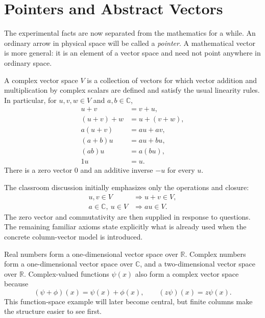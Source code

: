 \begin{classroomqa}
\end{classroomqa}

\section{Pointers and Abstract Vectors}

The experimental facts are now separated from the mathematics for a while. An ordinary arrow in physical space will be called a \emph{pointer}. A mathematical vector is more general: it is an element of a vector space and need not point anywhere in ordinary space.

\begin{definition}
A complex vector space \(V\) is a collection of vectors for which vector addition and multiplication by complex scalars are defined and satisfy the usual linearity rules. In particular, for \(u,v,w\in V\) and \(a,b\in\mathbb C\),
\begin{align}
  u+v&=v+u,\\
  (u+v)+w&=u+(v+w),\\
  a(u+v)&=au+av,\\
  (a+b)u&=au+bu,\\
  (ab)u&=a(bu),\\
  1u&=u.
\end{align}
There is a zero vector \(0\) and an additive inverse \(-u\) for every \(u\).
\end{definition}

The classroom discussion initially emphasizes only the operations and closure:
\begin{equation}
\begin{aligned}
  u,v\in V&\Longrightarrow u+v\in V,\\
  a\in\mathbb C,\ u\in V&\Longrightarrow au\in V.
\end{aligned}
\end{equation}
The zero vector and commutativity are then supplied in response to questions. The remaining familiar axioms state explicitly what is already used when the concrete column-vector model is introduced.

Real numbers form a one-dimensional vector space over \(\mathbb R\). Complex numbers form a one-dimensional vector space over \(\mathbb C\), and a two-dimensional vector space over \(\mathbb R\). Complex-valued functions \(\psi(x)\) also form a complex vector space because
\begin{equation}
  (\psi+\phi)(x)=\psi(x)+\phi(x),
  \qquad
  (z\psi)(x)=z\psi(x).
\end{equation}
This function-space example will later become central, but finite columns make the structure easier to see first.

